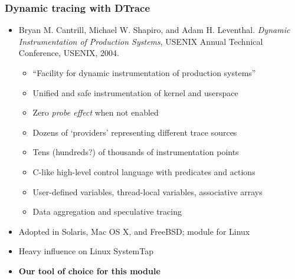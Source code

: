 \begin{frame}
  \frametitle{Dynamic tracing with DTrace}

  \begin{itemize}
    \item Bryan M. Cantrill, Michael W. Shapiro, and Adam H. Leventhal.
      \textit{Dynamic Instrumentation of Production Systems},
      USENIX Annual Technical Conference, USENIX, 2004.

    \pause

    \begin{itemize}
      \item ``Facility for dynamic instrumentation of production systems''
      \item Unified and safe instrumentation of kernel and userspace
      \item Zero \textit{probe effect} when not enabled

      \pause

      \item Dozens of `providers' representing different trace sources
      \item Tens (hundreds?) of thousands of instrumentation points

      \pause

      \item C-like high-level control language with predicates and actions
      \item User-defined variables, thread-local variables, associative arrays
      \item Data aggregation and speculative tracing
    \end{itemize}

    \pause

    \item Adopted in Solaris, Mac OS X, and FreeBSD; module for Linux
    \item Heavy influence on Linux SystemTap
    \item \textbf{Our tool of choice for this module}
  \end{itemize}
\end{frame}

